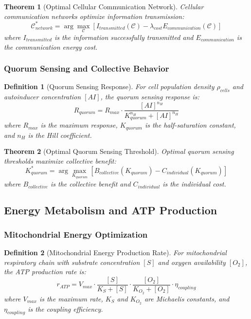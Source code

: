 \documentclass[12pt,a4paper]{article}
\newtheorem{theorem}{Theorem}
\newtheorem{definition}{Definition}
\begin{document}
\begin{theorem}[Optimal Cellular Communication Network]
Cellular communication networks optimize information transmission:
\begin{equation}
\mathcal{C}_{network}^* = \arg\max_{\mathcal{C}} \left[ I_{transmitted}(\mathcal{C}) - \lambda_{cost} E_{communication}(\mathcal{C}) \right]
\end{equation}
where $I_{transmitted}$ is the information successfully transmitted and $E_{communication}$ is the communication energy cost.
\end{theorem}

\subsubsection{Quorum Sensing and Collective Behavior}

\begin{definition}[Quorum Sensing Response]
For cell population density $\rho_{cells}$ and autoinducer concentration $[AI]$, the quorum sensing response is:
\begin{equation}
R_{quorum} = R_{max} \cdot \frac{[AI]^{n_H}}{K_{quorum}^{n_H} + [AI]^{n_H}}
\end{equation}
where $R_{max}$ is the maximum response, $K_{quorum}$ is the half-saturation constant, and $n_H$ is the Hill coefficient.
\end{definition}

\begin{theorem}[Optimal Quorum Sensing Threshold]
Optimal quorum sensing thresholds maximize collective benefit:
\begin{equation}
K_{quorum}^* = \arg\max_{K_{quorum}} \left[ B_{collective}(K_{quorum}) - C_{individual}(K_{quorum}) \right]
\end{equation}
where $B_{collective}$ is the collective benefit and $C_{individual}$ is the individual cost.
\end{theorem}

\subsection{Energy Metabolism and ATP Production}

\subsubsection{Mitochondrial Energy Optimization}

\begin{definition}[Mitochondrial Energy Production Rate]
For mitochondrial respiratory chain with substrate concentration $[S]$ and oxygen availability $[O_2]$, the ATP production rate is:
\begin{equation}
r_{ATP} = V_{max} \cdot \frac{[S]}{K_S + [S]} \cdot \frac{[O_2]}{K_{O_2} + [O_2]} \cdot \eta_{coupling}
\end{equation}
where $V_{max}$ is the maximum rate, $K_S$ and $K_{O_2}$ are Michaelis constants, and $\eta_{coupling}$ is the coupling efficiency.
\end{definition}
\end{document}
